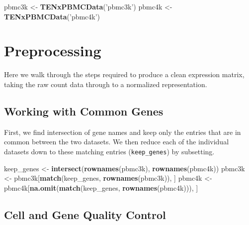 \documentclass[]{book}
\newenvironment{Shaded}{\begin{snugshade}}{\end{snugshade}}
\newcommand{\KeywordTok}[1]{\textcolor[rgb]{0.13,0.29,0.53}{\textbf{#1}}}
\newcommand{\NormalTok}[1]{#1}
\newcommand{\StringTok}[1]{\textcolor[rgb]{0.31,0.60,0.02}{#1}}
\begin{document}
\begin{Shaded}
\begin{Highlighting}[]
\NormalTok{pbmc3k <-}\StringTok{ }\KeywordTok{TENxPBMCData}\NormalTok{(}\StringTok{'pbmc3k'}\NormalTok{)}
\NormalTok{pbmc4k <-}\StringTok{ }\KeywordTok{TENxPBMCData}\NormalTok{(}\StringTok{'pbmc4k'}\NormalTok{)}
\end{Highlighting}
\end{Shaded}

\hypertarget{preprocessing}{%
\section{Preprocessing}\label{preprocessing}}

Here we walk through the steps required to produce a clean expression matrix, taking the raw count data through to a normalized representation.

\hypertarget{working-with-common-genes}{%
\subsection{Working with Common Genes}\label{working-with-common-genes}}

First, we find intersection of gene names and keep only the entries that are in common between the two datasets. We then reduce each of the individual datasets down to these matching entries (\texttt{keep\_genes}) by subsetting.

\begin{Shaded}
\begin{Highlighting}[]
\NormalTok{keep_genes <-}\StringTok{ }\KeywordTok{intersect}\NormalTok{(}\KeywordTok{rownames}\NormalTok{(pbmc3k), }\KeywordTok{rownames}\NormalTok{(pbmc4k))}
\NormalTok{pbmc3k <-}\StringTok{ }\NormalTok{pbmc3k[}\KeywordTok{match}\NormalTok{(keep_genes, }\KeywordTok{rownames}\NormalTok{(pbmc3k)), ]}
\NormalTok{pbmc4k <-}\StringTok{ }\NormalTok{pbmc4k[}\KeywordTok{na.omit}\NormalTok{(}\KeywordTok{match}\NormalTok{(keep_genes, }\KeywordTok{rownames}\NormalTok{(pbmc4k))), ]}
\end{Highlighting}
\end{Shaded}

\hypertarget{cell-and-gene-quality-control}{%
\subsection{Cell and Gene Quality Control}\label{cell-and-gene-quality-control}}
\end{document}
